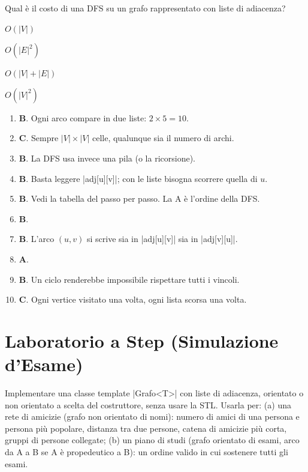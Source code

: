 \begin{quiz}{Qual è il costo di una DFS su un grafo rappresentato con liste di adiacenza?}
  \item $O(|V|)$
  \item $O(|E|^2)$
  \item $O(|V| + |E|)$
  \item $O(|V|^2)$
\end{quiz}

\begin{soluzione}
\begin{enumerate}[label=\textbf{\arabic*.}]
  \item \textbf{B}. Ogni arco compare in due liste: $2 \times 5 = 10$.
  \item \textbf{C}. Sempre $|V| \times |V|$ celle, qualunque sia il numero di archi.
  \item \textbf{B}. La DFS usa invece una pila (o la ricorsione).
  \item \textbf{B}. Basta leggere \cc|adj[u][v]|; con le liste bisogna scorrere quella di $u$.
  \item \textbf{B}. Vedi la tabella del passo per passo. La A è l'ordine della DFS.
  \item \textbf{B}.
  \item \textbf{B}. L'arco $(u,v)$ si scrive sia in \cc|adj[u][v]| sia in \cc|adj[v][u]|.
  \item \textbf{A}.
  \item \textbf{B}. Un ciclo renderebbe impossibile rispettare tutti i vincoli.
  \item \textbf{C}. Ogni vertice visitato una volta, ogni lista scorsa una volta.
\end{enumerate}
\end{soluzione}

\section{Laboratorio a Step (Simulazione d'Esame)}

\begin{traccia}
Implementare una classe template \cc|Grafo<T>| con liste di adiacenza, orientato o non
orientato a scelta del costruttore, senza usare la STL. Usarla per: (a) una rete di
amicizie (grafo non orientato di nomi): numero di amici di una persona e persona più
popolare, distanza tra due persone, catena di amicizie più corta, gruppi di persone
collegate; (b) un piano di studi (grafo orientato di esami, arco da A a B se A è
propedeutico a B): un ordine valido in cui sostenere tutti gli esami.
\end{traccia}

